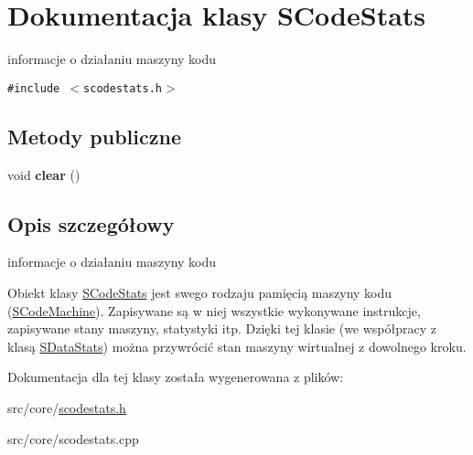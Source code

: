 \hypertarget{classSCodeStats}{
\section{Dokumentacja klasy SCodeStats}
\label{classSCodeStats}
}
informacje o działaniu maszyny kodu  


{\tt \#include $<$scodestats.h$>$}

\subsection*{Metody publiczne}
\begin{CompactItemize}
\item 
\hypertarget{classSCodeStats_1f65a603b9748d4cb4b3bb1f44d35744}{
void \textbf{clear} ()}
\label{classSCodeStats_1f65a603b9748d4cb4b3bb1f44d35744}

\end{CompactItemize}


\subsection{Opis szczegółowy}
informacje o działaniu maszyny kodu 

Obiekt klasy \hyperlink{classSCodeStats}{SCodeStats} jest swego rodzaju pamięcią maszyny kodu (\hyperlink{classSCodeMachine}{SCodeMachine}). Zapisywane są w niej wszystkie wykonywane instrukcje, zapisywane stany maszyny, statystyki itp. Dzięki tej klasie (we współpracy z klasą \hyperlink{classSDataStats}{SDataStats}) można przywrócić stan maszyny wirtualnej z dowolnego kroku. 

Dokumentacja dla tej klasy została wygenerowana z plików:\begin{CompactItemize}
\item 
src/core/\hyperlink{scodestats_8h}{scodestats.h}\item 
src/core/scodestats.cpp\end{CompactItemize}
